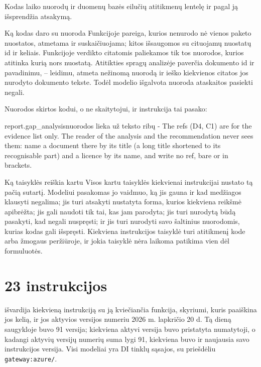 Kodas laiko nuorodų ir duomenų bazės eilučių atitikmenų lentelę ir pagal ją išsprendžia
atsakymą.

\begin{codebox}{Ką kodas daro su nuoroda}
Funkcijoje  pareiga, kurios  nenurodo nė vienos paketo
nuostatos, atmetama ir suskaičiuojama; kitos išsaugomos su cituojamų nuostatų id ir keliais.
Funkcijoje  verdikto citatomis paliekamos tik tos nuorodos, kurios
atitinka kurią nors nuostatą. Atitikties spragų analizėje  paverčia  dokumento id
ir pavadinimu,  -- leidimu, atmeta nežinomą nuorodą ir ieško kiekvienos citatos jos
nurodyto dokumento tekste. Todėl modelio išgalvota nuoroda ataskaitos pasiekti negali.
\end{codebox}

Nuorodos skirtos kodui, o ne skaitytojui, ir instrukcija tai pasako:

\begin{promptexcerpt}{report.gap_analysis}{nuorodos lieka už teksto ribų}
- The refs (D4, C1) are for the evidence list only. The reader of the analysis and
  the recommendation never sees them: name a document there by its title (a long
  title shortened to its recognisable part) and a licence by its name, and write no
  ref, bare or in brackets.
\end{promptexcerpt}

\begin{aibox}{Ką taisyklės reiškia kartu}
Visos kartu taisyklės kiekvienai instrukcijai nustato tą pačią sutartį. Modeliui
pasakomas jo vaidmuo, ką jis gauna ir kad medžiagos klausyti negalima; jis turi atsakyti
nustatyta forma, kurios kiekviena reikšmė apibrėžta; jis gali naudoti tik tai, kas jam
parodyta; jis turi nurodytą būdą pasakyti, kad negali nuspręsti; ir jis turi nurodyti savo
šaltinius nuorodomis, kurias kodas gali išspręsti. Kiekviena instrukcijos taisyklė turi
atitikmenį kode arba žmogaus peržiūroje, ir jokia taisyklė nėra laikoma patikima vien dėl
formuluotės.
\end{aibox}


\section{23 instrukcijos}\label{sec:prompts:all}

 išvardija kiekvieną instrukciją su ją kviečiančia funkcija, skyriumi,
kuris paaiškina jos kelią, ir jos aktyvios versijos numeriu 2026 m. lapkričio 20 d. Tą dieną
saugykloje buvo 91 versija; kiekviena aktyvi versija buvo pristatyta numatytoji, o kadangi
aktyvių versijų numerių suma lygi 91, kiekviena buvo ir naujausia savo instrukcijos versija.
Visi modeliai yra DI tinklų sąsajos, su priešdėliu \texttt{gateway:azure/}.

